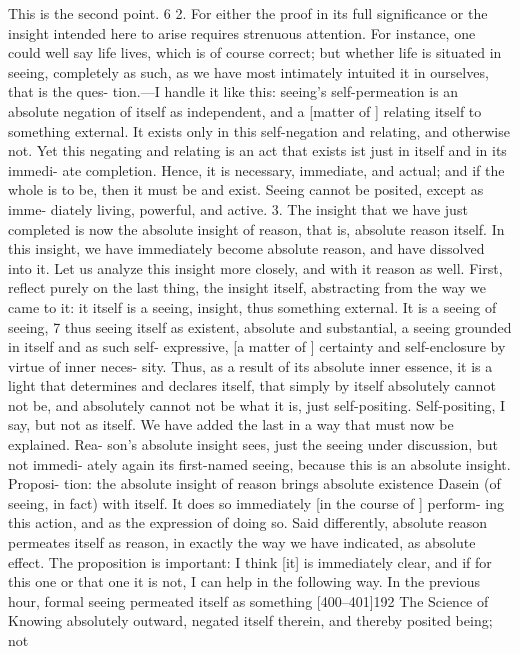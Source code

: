 This is the second point. 6
2. For either the proof in its full significance or the insight intended here
to arise requires strenuous attention. For instance, one could well say life lives,
which is of course correct; but whether life is situated in seeing, completely as
such, as we have most intimately intuited it in ourselves, that is the ques-
tion.—I handle it like this: seeing’s self-permeation is an absolute negation of
itself as independent, and a [matter of ] relating itself to something external.
It exists only in this self-negation and relating, and otherwise not. Yet this
negating and relating is an act that exists {ist} just in itself and in its immedi-
ate completion. Hence, it is necessary, immediate, and actual; and if the whole
is to be, then it must be and exist. Seeing cannot be posited, except as imme-
diately living, powerful, and active.
3. The insight that we have just completed is now the absolute insight
of reason, that is, absolute reason itself. In this insight, we have immediately
become absolute reason, and have dissolved into it. Let us analyze this insight
more closely, and with it reason as well. First, reflect purely on the last thing,
the insight itself, abstracting from the way we came to it: it itself is a seeing,
insight, thus something external. It is a seeing of seeing, 7 thus seeing itself as
existent, absolute and substantial, a seeing grounded in itself and as such self-
expressive, [a matter of ] certainty and self-enclosure by virtue of inner neces-
sity. Thus, as a result of its absolute inner essence, it is a light that determines
and declares itself, that simply by itself absolutely cannot not be, and
absolutely cannot not be what it is, just self-positing. Self-positing, I say, but
not as itself. We have added the last in a way that must now be explained. Rea-
son’s absolute insight sees, just the seeing under discussion, but not immedi-
ately again its first-named seeing, because this is an absolute insight. Proposi-
tion: the absolute insight of reason brings absolute existence {Dasein} (of
seeing, in fact) with itself. It does so immediately [in the course of ] perform-
ing this action, and as the expression of doing so. Said differently, absolute
reason permeates itself as reason, in exactly the way we have indicated, as
absolute effect. The proposition is important: I think [it] is immediately clear,
and if for this one or that one it is not, I can help in the following way. In the
previous hour, formal seeing permeated itself as something [400–401]192
The Science of Knowing
absolutely outward, negated itself therein, and thereby posited being; not
